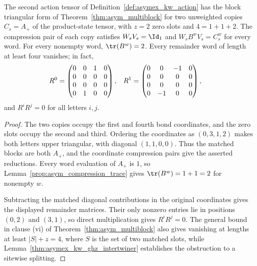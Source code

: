 \begin{lemma}
    \label{thm:asymex_kw_ghz}
    \leanok
    The second action tensor of Definition~\ref{def:asymex_kw_action}
    has the block triangular form of Theorem~\ref{thm:asym_multiblock}
    for two unweighted copies $C_s=A_+$ of the product-state tensor,
    with $z=2$ zero slots and $4=1+1+2$. The compression pair of each
    copy satisfies $W_sV_s=\Id_1$ and $W_sB^wV_s=C_s^w$ for every word.
    For every nonempty word, $\tr(B^w)=2$.
    Every remainder word of length at least four vanishes; in fact,
    \begin{align}
        R^0 & =\begin{pmatrix}
                   0 & 0 & 1 & 0 \\
                   0 & 0 & 0 & 0 \\
                   0 & 0 & 0 & 0 \\
                   0 & 1 & 0 & 0
               \end{pmatrix},
            & R^1
            & =\begin{pmatrix}
                   0 & 0  & -1 & 0 \\
                   0 & 0  & 0  & 0 \\
                   0 & 0  & 0  & 0 \\
                   0 & -1 & 0  & 0
               \end{pmatrix},
        \notag
    \end{align}
    and $R^iR^j=0$ for all letters $i,j$.
\end{lemma}

\begin{proof}
    \leanok
    The two copies occupy the first and fourth bond coordinates, and
    the zero slots occupy the second and third. Ordering the coordinates
    as $(0,3,1,2)$ makes both letters upper triangular, with diagonal
    $(1,1,0,0)$. Thus the matched blocks are both $A_+$, and the
    coordinate compression pairs give the asserted reductions.
    Every word evaluation of $A_+$ is $1$, so
    Lemma~\ref{prop:asym_compression_trace} gives
    $\tr(B^w)=1+1=2$ for nonempty $w$.

    Subtracting the matched diagonal contributions in the original
    coordinates gives the displayed remainder matrices. Their only
    nonzero entries lie in positions $(0,2)$ and $(3,1)$, so direct
    multiplication gives $R^iR^j=0$. The general bound in clause (vi)
    of Theorem~\ref{thm:asym_multiblock} also gives vanishing at lengths
    at least $|S|+z=4$, where $S$ is the set of two matched slots, while
    Lemma~\ref{thm:asymex_kw_ghz_intertwiner} establishes the
    obstruction to a sitewise splitting.
\end{proof}

